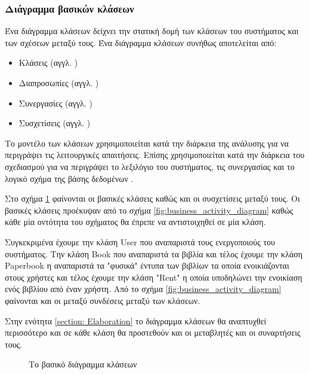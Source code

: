 \documentclass{assignment}
\begin{document}
\subsubsection{Διάγραμμα βασικών κλάσεων}

Ένα διάγραμμα κλάσεων δείχνει την στατική δομή των κλάσεων του συστήματος και των σχέσεων μεταξύ τους. Ένα διάγραμμα κλάσεων συνήθως αποτελείται από:

\begin{itemize}
\item Κλάσεις (αγγλ. )
\item Διαπροσωπίες (αγγλ. )
\item Συνεργασίες (αγγλ. )
\item Συσχετίσεις (αγγλ. )
\end{itemize}

Το μοντέλο των κλάσεων χρησιμοποιείται κατά την διάρκεια της ανάλυσης για να περιγράψει τις λειτουργικές απαιτήσεις. Επίσης χρησιμοποιείται κατά την διάρκεια του σχεδιασμού για να περιγράψει το λεξιλόγιο του συστήματος, τις συνεργασίας και το λογικό σχήμα της βάσης δεδομένων \cite{Rumbaugh:2004:UML:993859}.

Στο σχήμα \ref{fig:basic_class_diagramm} φαίνονται οι βασικές κλάσεις καθώς και οι συσχετίσεις μεταξύ τους. Οι βασικές κλάσεις προέκυψαν από το σχήμα \ref{fig:business_activity_diagram} καθώς κάθε μία οντότητα του σχήματος θα έπρεπε να αντιστοιχηθεί σε μία κλάση.

Συγκεκριμένα έχουμε την κλάση User που αναπαριστά τους ενεργοποιούς του συστήματος. Την κλάση Book που αναπαριστά τα βιβλία και τέλος έχουμε την κλάση Paperbook η αναπαριστά τα "φυσικά" έντυπα των βιβλίων τα οποία ενοικιάζονται στους χρήστες και τέλος έχουμε την κλάση "Rent" η οποία υποδηλώνει την ενοικίαση ενός βιβλίου από έναν χρήστη. Από το σχήμα \ref{fig:business_activity_diagram} φαίνονται και οι μεταξύ συνδέσεις μεταξύ των κλάσεων.

Στην ενότητα \ref{section: Elaboration} το διάγραμμα κλάσεων θα αναπτυχθεί περισσότερο και σε κάθε κλάση θα προστεθούν και οι μεταβλητές και οι συναρτήσεις τους.

\begin{figure}
\begin{center}
\caption{Το βασικό διάγραμμα κλάσεων}
\label{fig:basic_class_diagramm}
\end{center}
\end{figure}
\end{document}
